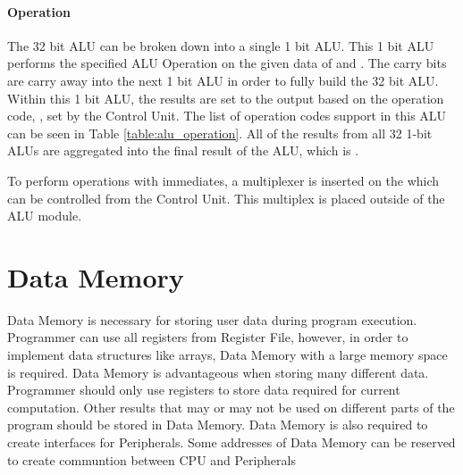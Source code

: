 \paragraph*{Operation}
The 32 bit ALU can be broken down into a single 1 bit ALU.
This 1 bit ALU performs the specified ALU Operation on the given data of  and .
The carry bits are carry away into the next 1 bit ALU in order to fully build the 32 bit ALU.
Within this 1 bit ALU, the results are set to the output based on the operation code, , set by the Control Unit.
The list of operation codes support in this ALU can be seen in Table \ref{table:alu_operation}. All of the results
from all 32 1-bit ALUs are aggregated into the final result of the ALU, which is .
\begin{table}[!h]
    \centering
    \caption{Support ALU Operation and Their Operation Codes}
    \label{table:alu_operation}
\end{table}

To perform operations with immediates, a multiplexer is inserted on the  which can be controlled from the Control Unit.
This multiplex is placed outside of the ALU module.


\section{Data Memory}
Data Memory is necessary for storing user data during program execution.
Programmer can use all registers from Register File, however, in order to implement data structures like arrays, Data Memory with a large memory space is required.
Data Memory is advantageous when storing many different data.
Programmer should only use registers to store data required for current computation.
Other results that may or may not be used on different parts of the program should be stored in Data Memory.
Data Memory is also required to create interfaces for Peripherals.
Some addresses of Data Memory can be reserved to create communtion between CPU and Peripherals

